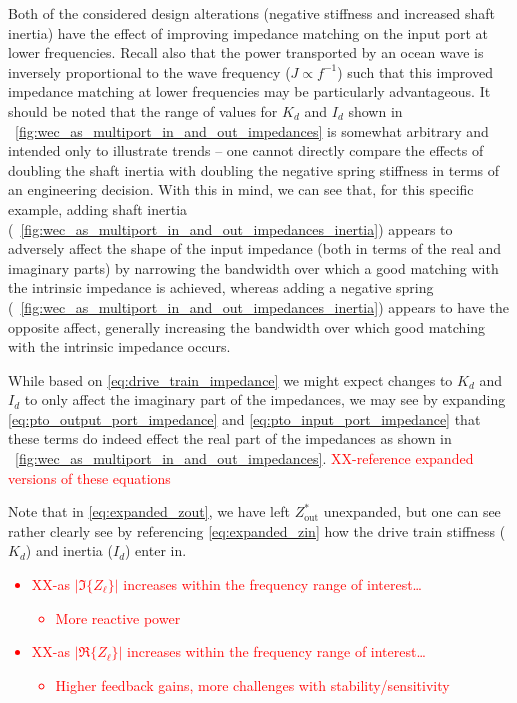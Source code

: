 \documentclass[lettersize,journal]{IEEEtran}
\newcommand{\rc}[1]{\textcolor{red}{#1}}
\begin{document}
Both of the considered design alterations (negative stiffness and increased shaft inertia) have the effect of improving impedance matching on the input port at lower frequencies.
Recall also that the power transported by an ocean wave is inversely proportional to the wave frequency ($J \propto f^{-1}$) such that this improved impedance matching at lower frequencies may be particularly advantageous.
It should be noted that the range of values for $K_d$ and $I_d$ shown in \figurename~\ref{fig:wec_as_multiport_in_and_out_impedances} is somewhat arbitrary and intended only to illustrate trends -- one cannot directly compare the effects of doubling the shaft inertia with doubling the negative spring stiffness in terms of an engineering decision.
With this in mind, we can see that, for this specific example, adding shaft inertia (\figurename~\ref{fig:wec_as_multiport_in_and_out_impedances_inertia}) appears to adversely affect the shape of the input impedance (both in terms of the real and imaginary parts) by narrowing the bandwidth over which a good matching with the intrinsic impedance is achieved, whereas adding a negative spring (\figurename~\ref{fig:wec_as_multiport_in_and_out_impedances_inertia}) appears to have the opposite affect, generally increasing the bandwidth over which good matching with the intrinsic impedance occurs.


While based on \eqref{eq:drive_train_impedance} we might expect changes to $K_d$ and $I_d$ to only affect the imaginary part of the impedances, we may see by expanding \eqref{eq:pto_output_port_impedance} and \eqref{eq:pto_input_port_impedance} that these terms do indeed effect the real part of the impedances as shown in \figurename~\ref{fig:wec_as_multiport_in_and_out_impedances}.
\rc{XX-reference expanded versions of these equations}

\noindent{}Note that in \eqref{eq:expanded_zout}, we have left $Z_{\textrm{out}}^*$ unexpanded, but one can see rather clearly see by referencing \eqref{eq:expanded_zin} how the drive train stiffness ($K_d$) and inertia ($I_d$) enter in.

\rc{
\begin{itemize}
        \item XX-as $| \Im \{ Z_\ell \} |$ increases within the frequency range of interest\dots{}
        \begin{itemize}
                \item More reactive power
        \end{itemize}
        \item XX-as $| \Re \{ Z_\ell \} |$ increases within the frequency range of interest\dots{}
        \begin{itemize}
                \item Higher feedback gains, more challenges with stability/sensitivity
        \end{itemize}
\end{itemize}}
\end{document}
